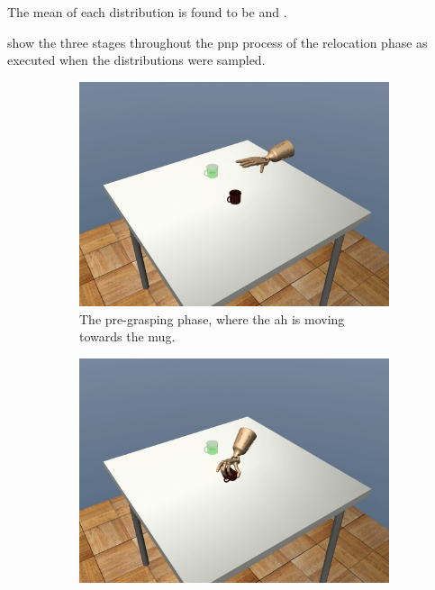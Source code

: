The mean of each distribution is found to be  and . \medskip

 show the three stages throughout the \gls{pnp} process of the relocation phase as executed when the distributions were sampled.

\begin{figure}[!h]
	\centering
	\begin{subfigure}[b]{0.32\textwidth}
		\centering
		\includegraphics[width=\textwidth]{chapters/3-in-hand-manipulation/fig/frame_10.png}
		\caption{The pre-grasping phase, where the \gls{ah} is moving towards the mug.}
		\label{fig:ai-frame-1}
	\end{subfigure}
	\hfill
	\begin{subfigure}[b]{0.32\textwidth}
		\centering
		\includegraphics[width=\textwidth]{chapters/3-in-hand-manipulation/fig/frame_21.png}

\end{subfigure}
\end{figure}
